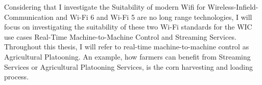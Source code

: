 Considering that I investigate the Suitability of modern Wifi for Wireless-Infield-Communication and Wi-Fi 6 and Wi-Fi 5 are no long range technologies,
I will focus on investigating the suitability of these two Wi-Fi standards for the \ac{WIC} use cases Real-Time Machine-to-Machine Control and Streaming Services.
Throughout this thesis, I will refer to real-time machine-to-machine control as Agricultural Platooning.
An example, how farmers can benefit from Streaming Services or Agricultural Platooning Services, is the corn harvesting and loading process.
